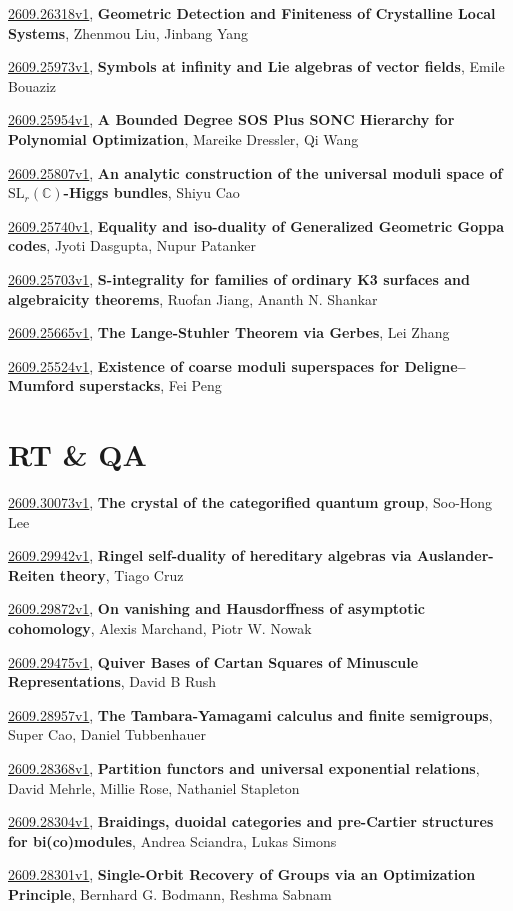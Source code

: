 \documentclass[9pt, a4paper]{article}
\theoremstyle{plain}
\theoremstyle{definition}
\theoremstyle{remark}
\newcommand{\arxiv}[3]{\href{https://arxiv.org/abs/#1}{#1}, \textbf{\textcolor{arxivblue}{#2}}, #3}
\begin{document}
\arxiv{2609.26318v1}{Geometric Detection and Finiteness of Crystalline Local Systems}{Zhenmou Liu, Jinbang Yang}

\arxiv{2609.25973v1}{Symbols at infinity and Lie algebras of vector fields}{Emile Bouaziz}

\arxiv{2609.25954v1}{A Bounded Degree SOS Plus SONC Hierarchy for Polynomial Optimization}{Mareike Dressler, Qi Wang}

\arxiv{2609.25807v1}{An analytic construction of the universal moduli space of $\mathrm{SL}_r(\mathbb C)$-Higgs bundles}{Shiyu Cao}

\arxiv{2609.25740v1}{Equality and iso-duality of Generalized Geometric Goppa codes}{Jyoti Dasgupta, Nupur Patanker}

\arxiv{2609.25703v1}{S-integrality for families of ordinary K3 surfaces and algebraicity theorems}{Ruofan Jiang, Ananth N. Shankar}

\arxiv{2609.25665v1}{The Lange-Stuhler Theorem via Gerbes}{Lei Zhang}

\arxiv{2609.25524v1}{Existence of coarse moduli superspaces for Deligne--Mumford superstacks}{Fei Peng}


\section{RT \& QA}
\arxiv{2609.30073v1}{The crystal of the categorified quantum group}{Soo-Hong Lee}

\arxiv{2609.29942v1}{Ringel self-duality of hereditary algebras via Auslander-Reiten theory}{Tiago Cruz}

\arxiv{2609.29872v1}{On vanishing and Hausdorffness of asymptotic cohomology}{Alexis Marchand, Piotr W. Nowak}

\arxiv{2609.29475v1}{Quiver Bases of Cartan Squares of Minuscule Representations}{David B Rush}

\arxiv{2609.28957v1}{The Tambara-Yamagami calculus and finite semigroups}{Super Cao, Daniel Tubbenhauer}

\arxiv{2609.28368v1}{Partition functors and universal exponential relations}{David Mehrle, Millie Rose, Nathaniel Stapleton}

\arxiv{2609.28304v1}{Braidings, duoidal categories and pre-Cartier structures for bi(co)modules}{Andrea Sciandra, Lukas Simons}

\arxiv{2609.28301v1}{Single-Orbit Recovery of Groups via an Optimization Principle}{Bernhard G. Bodmann, Reshma Sabnam}
\end{document}
